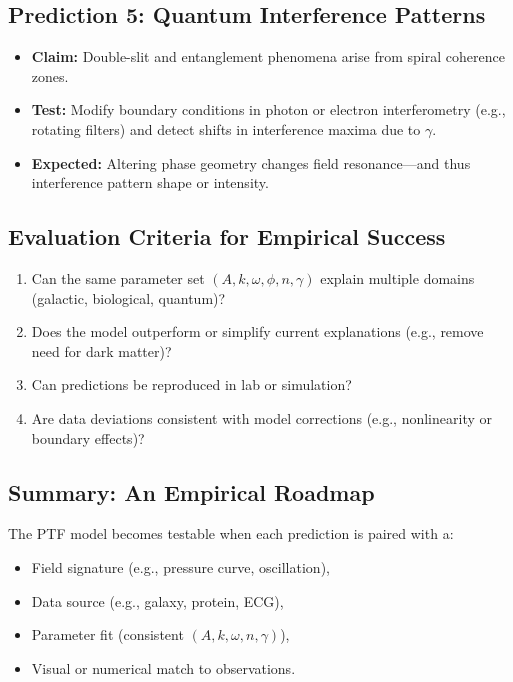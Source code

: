 \documentclass[a4paper,12pt]{article}
\begin{document}
\subsection{Prediction 5: Quantum Interference Patterns}

\begin{itemize}
    \item \textbf{Claim:} Double-slit and entanglement phenomena arise from spiral coherence zones.
    \item \textbf{Test:} Modify boundary conditions in photon or electron interferometry (e.g., rotating filters) and detect shifts in interference maxima due to \(\gamma\).
    \item \textbf{Expected:} Altering phase geometry changes field resonance—and thus interference pattern shape or intensity.
\end{itemize}

\subsection{Evaluation Criteria for Empirical Success}

\begin{enumerate}
    \item Can the same parameter set \((A, k, \omega, \phi, n, \gamma)\) explain multiple domains (galactic, biological, quantum)?
    \item Does the model outperform or simplify current explanations (e.g., remove need for dark matter)?
    \item Can predictions be reproduced in lab or simulation?
    \item Are data deviations consistent with model corrections (e.g., nonlinearity or boundary effects)?
\end{enumerate}

\subsection{Summary: An Empirical Roadmap}

The PTF model becomes testable when each prediction is paired with a:
\begin{itemize}
    \item Field signature (e.g., pressure curve, oscillation),
    \item Data source (e.g., galaxy, protein, ECG),
    \item Parameter fit (consistent \((A, k, \omega, n, \gamma)\)),
    \item Visual or numerical match to observations.
\end{itemize}
\end{document}
